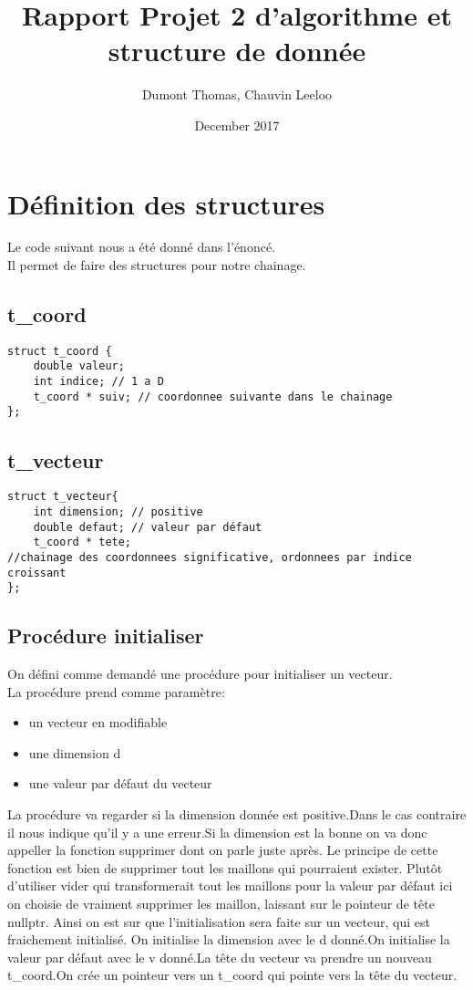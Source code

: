 \documentclass[a4paper,11pt,final]{article}
\title{Rapport Projet 2 d'algorithme et structure de donnée}
\author{Dumont Thomas, Chauvin Leeloo}
\date{December 2017}
\begin{document}
\maketitle

\section{Définition des structures}
Le code suivant nous a été donné dans l'énoncé.\\
Il permet de faire des structures pour notre chainage.
\subsection{t\_coord}
\begin{verbatim}
struct t_coord {
    double valeur;
    int indice; // 1 a D
    t_coord * suiv; // coordonnee suivante dans le chainage
};
\end{verbatim}
\subsection{t\_vecteur}
\begin{verbatim}
struct t_vecteur{
    int dimension; // positive
    double defaut; // valeur par défaut
    t_coord * tete; 
//chainage des coordonnees significative, ordonnees par indice croissant
};
\end{verbatim}
\subsection{Procédure initialiser}
On défini comme demandé une procédure pour initialiser un vecteur.\\
La procédure prend comme paramètre:
\begin{itemize}
    \item un vecteur en modifiable
    \item une dimension d
    \item une valeur par défaut du vecteur
\end{itemize} 
La procédure va regarder si la dimension donnée est positive.Dans le cas contraire il nous indique qu'il y a une erreur.Si la dimension est la bonne on va donc appeller la fonction supprimer dont on parle juste après. Le principe de cette fonction est bien de supprimer tout les maillons qui pourraient exister. Plutôt d'utiliser vider qui transformerait tout les maillons pour la valeur par défaut ici on choisie de vraiment supprimer les maillon, laissant sur le pointeur de tête nullptr. Ainsi on est sur que l'initialisation sera faite sur un vecteur, qui est fraichement initialisé. On initialise la dimension avec le d donné.On initialise la valeur par défaut avec le v donné.La tête du vecteur va prendre un nouveau t\_coord.On crée un pointeur vers un t\_coord qui pointe vers la tête du vecteur.\\
\end{document}
